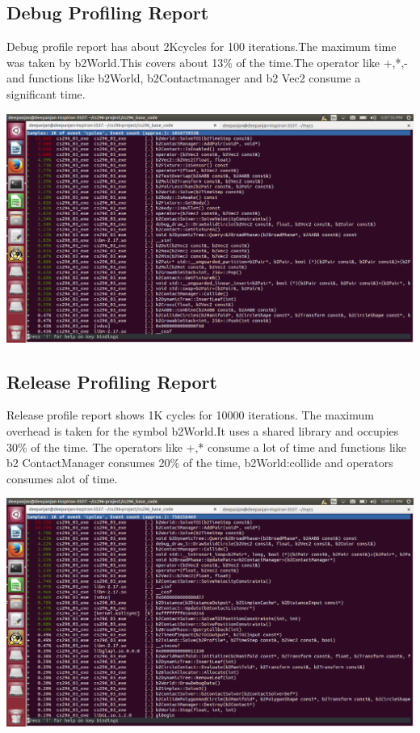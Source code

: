 \documentclass[11pt]{article}
\begin{document}
\subsection{Debug Profiling Report}
Debug profile report has about 2Kcycles for 100 iterations.The maximum time was taken by b2World.This covers about 13\% of the time.The operator like +,*,- and functions like b2World, b2Contactmanager and b2 Vec2 consume 
a significant time.
\begin{center}
  \includegraphics[scale=.25]{debug.png}
\end{center}
\subsection{Release Profiling Report}
Release profile report shows 1K cycles for 10000 iterations. The maximum overhead is taken for the symbol b2World.It uses a shared library and occupies 30\% of the time.
The operators like +,* consume a lot of time and functions like b2 ContactManager consumes 20\% of the time, b2World:collide and operators consumes alot of time.
\begin{center}
  \includegraphics[scale=.3]{release.png}
\end{center}
\end{document}
